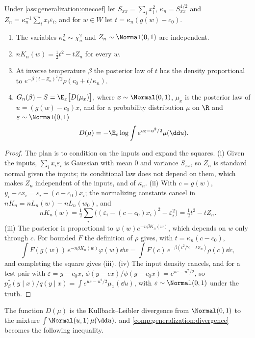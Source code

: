 \begin{refsection}
\begin{lemma}\label{lem:generalization:reduction}
Under \cref{ass:generalization:onecoef} let $S_{xx}=\sum_ix_i^2$, $\kappa_n=S_{xx}^{1/2}$ and $Z_n=\kappa_n^{-1}\sum_ix_i\varepsilon_i$, and for $w\in W$ let $t=\kappa_n(g(w)-c_0)$.
\begin{enumerate}[label=(\roman*),nosep]
\item The variables $\kappa_n^2\sim\chi^2_n$ and $Z_n\sim\Normal(0,1)$ are independent.
\item $nK_n(w)=\frac12t^2-tZ_n$ for every $w$.
\item At inverse temperature $\beta$ the posterior law of $t$ has the density proportional to $e^{-\beta(t-Z_n)^2/2}\rho(c_0+t/\kappa_n)$.
\item $G_n(\beta)-S=\E_x\bigl[D(\mu_x)\bigr]$, where $x\sim\Normal(0,1)$, $\mu_x$ is the posterior law of $u=(g(w)-c_0)x$, and for a probability distribution $\mu$ on $\R$ and $\varepsilon\sim\Normal(0,1)$
\[
D(\mu)=-\E_\varepsilon\log\int e^{u\varepsilon-u^2/2}\mu(\dd u).
\]
\end{enumerate}
\end{lemma}

\begin{proof}
The plan is to condition on the inputs and expand the squares. (i) Given the inputs, $\sum_ix_i\varepsilon_i$ is Gaussian with mean $0$ and variance $S_{xx}$, so $Z_n$ is standard normal given the inputs; its conditional law does not depend on them, which makes $Z_n$ independent of the inputs, and of $\kappa_n$. (ii) With $c=g(w)$, $y_i-cx_i=\varepsilon_i-(c-c_0)x_i$; the normalizing constants cancel in $nK_n=nL_n(w)-nL_n(w_0)$, and
\[
nK_n(w)=\tfrac12\sum_i\bigl((\varepsilon_i-(c-c_0)x_i)^2-\varepsilon_i^2\bigr)=\tfrac12t^2-tZ_n .
\]
(iii) The posterior is proportional to $\varphi(w)e^{-n\beta K_n(w)}$, which depends on $w$ only through $c$. For bounded $F$ the definition of $\rho$ gives, with $t=\kappa_n(c-c_0)$,
\[
\int F(g(w))\,e^{-n\beta K_n(w)}\varphi(w)\dd w=\int F(c)\,e^{-\beta(t^2/2-tZ_n)}\rho(c)\dd c,
\]
and completing the square gives (iii). (iv) The input density cancels, and for a test pair with $\varepsilon=y-c_0x$, $\phi(y-cx)/\phi(y-c_0x)=e^{u\varepsilon-u^2/2}$, so $p^*_\beta(y\mid x)/q(y\mid x)=\int e^{u\varepsilon-u^2/2}\mu_x(\dd u)$, with $\varepsilon\sim\Normal(0,1)$ under the truth.
\end{proof}

The function $D(\mu)$ is the Kullback--Leibler divergence from $\Normal(0,1)$ to the mixture $\int\Normal(u,1)\,\mu(\dd u)$, and \cref{comp:generalization:divergence} becomes the following inequality.


\end{refsection}
